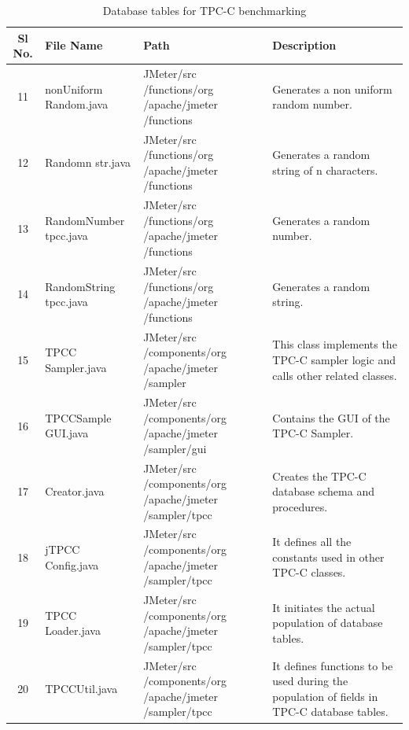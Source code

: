 \documentclass[12pt]{book}
\begin{document}
  \begin{table}[H]
  \begin{center}
   \begin{tabular}{|c|p{3cm}|p{4cm}|p{6cm}|} 
   \hline
   \textbf{Sl No.} & \textbf{File Name} & \textbf{Path} & \textbf{Description}\\
   \hline
   11 & nonUniform Random.java & JMeter/src /functions/org /apache/jmeter /functions & Generates a non uniform random number.\\
   \hline
   12 & Randomn str.java & JMeter/src /functions/org /apache/jmeter /functions & Generates a random string of n characters. \\
   \hline 
   13 & RandomNumber tpcc.java & JMeter/src /functions/org /apache/jmeter /functions & Generates a random number.\\
   \hline
   14 & RandomString tpcc.java & JMeter/src /functions/org /apache/jmeter /functions & Generates a random string. \\
   \hline 
   15 & TPCC Sampler.java & JMeter/src /components/org /apache/jmeter /sampler & This class implements the TPC-C sampler logic and calls other related classes. \\
   \hline
   16 & TPCCSample GUI.java & JMeter/src /components/org /apache/jmeter /sampler/gui & Contains the GUI of the TPC-C Sampler.\\
   \hline
   17 & Creator.java & JMeter/src /components/org /apache/jmeter /sampler/tpcc & Creates the TPC-C database schema and procedures.\\
   \hline
   18 & jTPCC Config.java & JMeter/src /components/org /apache/jmeter /sampler/tpcc & It defines all the constants used in other TPC-C classes.\\
   \hline
   19 & TPCC Loader.java &  JMeter/src /components/org /apache/jmeter /sampler/tpcc & It initiates the actual population of database tables.\\
   \hline
   20 & TPCCUtil.java &  JMeter/src /components/org /apache/jmeter /sampler/tpcc & It defines functions to be used during the population of fields in TPC-C database tables.\\
   \hline
        \end{tabular}
   \caption{Database tables for TPC-C benchmarking}
  \end{center}
 \end{table}
\end{document}
